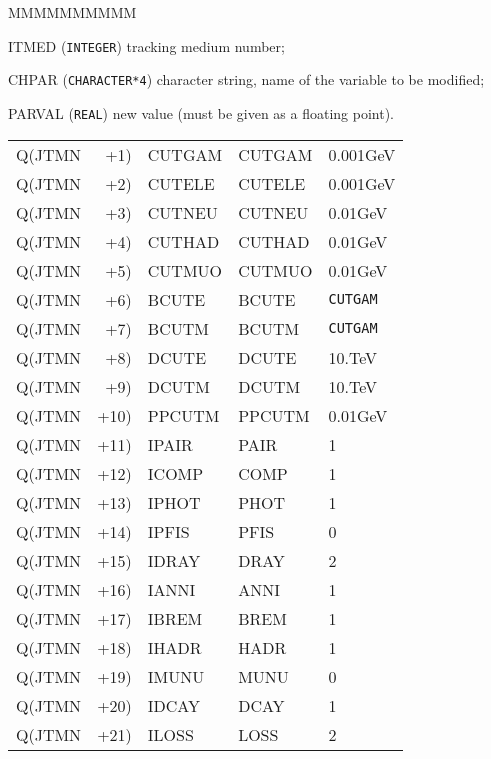 \begin{DLtt}{MMMMMMMMMM}
\item[ITMED]   ({\tt INTEGER}) tracking medium number;
\item[CHPAR]   ({\tt CHARACTER*4}) character string, name of the variable 
to be modified;
\item[PARVAL]  ({\tt REAL}) new value (must be given as a floating point).
\end{DLtt}
\begin{center} 
\begin{tabular}{|>{\ttfamily}r@{}>{\ttfamily}r@{\quad=\quad}>{\ttfamily}l|>{\ttfamily}l|l|}
 \hline
\multicolumn{3}{|c|}{Default parameters}
& \multicolumn{1}{c|}{Parameter name} 
& \multicolumn{1}{c|}{Default value} \\
\hline
Q(JTMN & +1) & CUTGAM & CUTGAM & 0.001GeV \\
Q(JTMN & +2) & CUTELE & CUTELE & 0.001GeV \\
Q(JTMN & +3) & CUTNEU & CUTNEU & 0.01GeV  \\
Q(JTMN & +4) & CUTHAD & CUTHAD & 0.01GeV  \\
Q(JTMN & +5) & CUTMUO & CUTMUO & 0.01GeV  \\
Q(JTMN & +6) & BCUTE  & BCUTE  & \texttt{CUTGAM}   \\
Q(JTMN & +7) & BCUTM  & BCUTM  & \texttt{CUTGAM}   \\
Q(JTMN & +8) & DCUTE  & DCUTE  & 10.TeV   \\
Q(JTMN & +9) & DCUTM  & DCUTM  & 10.TeV   \\
Q(JTMN & +10)& PPCUTM & PPCUTM & 0.01GeV  \\
Q(JTMN & +11)& IPAIR  &  PAIR  & 1        \\
Q(JTMN & +12)& ICOMP  &  COMP  & 1        \\
Q(JTMN & +13)& IPHOT  &  PHOT  & 1        \\
Q(JTMN & +14)& IPFIS  &  PFIS  & 0        \\
Q(JTMN & +15)& IDRAY  &  DRAY  & 2        \\
Q(JTMN & +16)& IANNI  &  ANNI  & 1        \\
Q(JTMN & +17)& IBREM  &  BREM  & 1        \\
Q(JTMN & +18)& IHADR  &  HADR  & 1        \\
Q(JTMN & +19)& IMUNU  &  MUNU  & 0        \\
Q(JTMN & +20)& IDCAY  &  DCAY  & 1        \\
Q(JTMN & +21)& ILOSS  &  LOSS  & 2        \\

\end{tabular}
\end{center}
